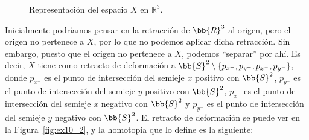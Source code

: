 \documentclass[12pt]{article}
\begin{document}
\begin{ejercicio}
\begin{figure}[h]
            \caption{Representación del espacio $X$ en $\mathbb{R}^3$.}
            \label{fig:ex10_1}
        \end{figure}

        Inicialmente podríamos pensar en la retracción de $\bb{R}^3$ al origen, pero el origen no pertenece a $X$, por lo que no podemos aplicar dicha retracción. Sin embargo, puesto que el origen no pertenece a $X$, podemos ``separar'' por ahí. Es decir, $X$ tiene como retracto de deformación a $\bb{S}^2\setminus \{p_{x^+},p_{y^+}, p_{x^-},p_{y^-}\}$, donde $p_{x^+}$ es el punto de intersección del semieje $x$ positivo con $\bb{S}^2$, $p_{y^+}$ es el punto de intersección del semieje $y$ positivo con $\bb{S}^2$, $p_{x^-}$ es el punto de intersección del semieje $x$ negativo con $\bb{S}^2$ y $p_{y^-}$ es el punto de intersección del semieje $y$ negativo con $\bb{S}^2$. El retracto de deformación se puede ver en la Figura~\ref{fig:ex10_2}, y la homotopía que lo define es la siguiente:
        \begin{figure}[htbp]
            \centering
\end{figure}
\end{ejercicio}
\end{document}
